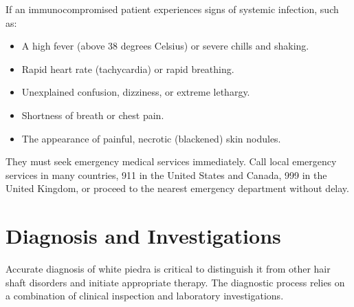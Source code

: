 If an immunocompromised patient experiences signs of systemic infection, such as:
\begin{itemize}
    \item A high fever (above 38 degrees Celsius) or severe chills and shaking.
    \item Rapid heart rate (tachycardia) or rapid breathing.
    \item Unexplained confusion, dizziness, or extreme lethargy.
    \item Shortness of breath or chest pain.
    \item The appearance of painful, necrotic (blackened) skin nodules.
\end{itemize}
They must seek emergency medical services immediately. Call local emergency services in many countries, 911 in the United States and Canada, 999 in the United Kingdom, or proceed to the nearest emergency department without delay.

\section*{Diagnosis and Investigations}
Accurate diagnosis of white piedra is critical to distinguish it from other hair shaft disorders and initiate appropriate therapy. The diagnostic process relies on a combination of clinical inspection and laboratory investigations.

